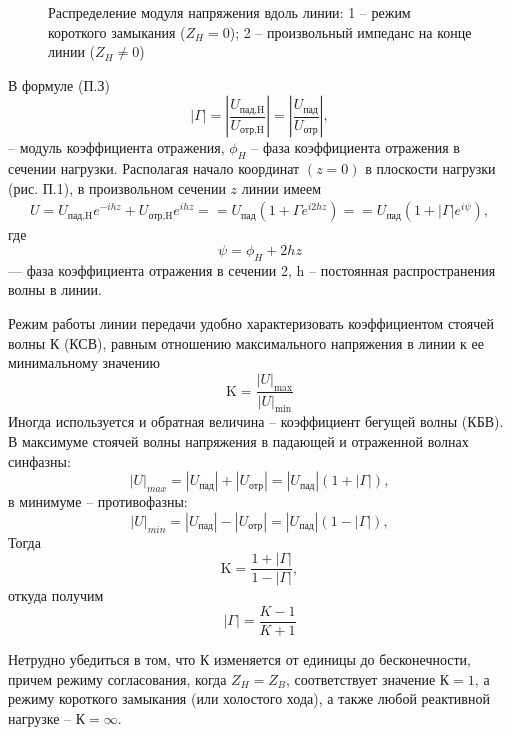 \begin{figure}[h!]
	\centering
	\caption{Распределение модуля напряжения вдоль линии: 1 -- режим короткого замыкания ($Z_H=0$); 2 -- произвольный импеданс на конце линии ($Z_H\ne0$)}
	\label{fig:p1}
\end{figure}
В формуле (П.З)
\begin{equation}
	|\Gamma|=\left|\frac{U_\text{пад,H}}{U_\text{отр,H}}\right|=\left|\frac{U_\text{пад}}{U_\text{отр}}\right|,
\end{equation}
-- модуль коэффициента отражения, $\phi_H$ -- фаза коэффициента отражения в сечении нагрузки. Располагая начало координат $(z = 0)$ в плоскости нагрузки (рис. П.1), в произвольном сечении $z$ линии имеем
\begin{gather}
	U=U_\text{пад,H}e^{-ihz}+U_\text{отр,H}e^{ihz}=
		=U_\text{пад}(1+\Gamma e^{i2hz})=
		=U_\text{пад}(1+|\Gamma|e^{i\psi}),
\end{gather}
где
\begin{equation}
	\psi=\phi_H+2hz
\end{equation}
--- фаза коэффициента отражения в сечении 2, h -- постоянная распространения волны в линии.

Режим работы линии передачи удобно характеризовать коэффициентом стоячей волны К (КСВ), равным отношению максимального напряжения в линии к ее минимальному значению
\begin{equation}
	\mathrm { K } = \frac { | U | _ { \max } } { | U | _ { \min } }
\end{equation}
Иногда используется и обратная величина -- коэффициент бегущей волны (КБВ). В максимуме стоячей волны напряжения в падающей и отраженной волнах синфазны:
\begin{equation}
	|U|_{max}=|U_\text{пад}|+|U_\text{отр}|=|U_\text{пад}|(1+|\Gamma|),
\end{equation}
в минимуме -- противофазны:
\begin{equation}
	|U|_{min}=|U_\text{пад}|-|U_\text{отр}|=|U_\text{пад}|(1-|\Gamma|),
\end{equation}
Тогда
\begin{equation}
	\mathrm { K } = \frac { 1 + | \Gamma | } { 1 - | \Gamma | },
\end{equation}
откуда получим
\begin{equation}
	| \Gamma | = \frac { K - 1 } { K + 1 }
\end{equation}

Нетрудно убедиться в том, что К изменяется от единицы до бесконечности, причем режиму согласования, когда $Z_H = Z_B$, соответствует значение $\mathrm{К}=1$, а режиму короткого замыкания (или холостого хода), а также любой реактивной нагрузке -- $\mathrm{К}=\infty$.

